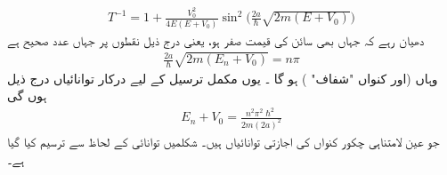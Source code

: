 \begin{align}\label{مساوات_شروڈنگر_ترسیلی_حل}
T^{-1}=1+\frac{V_{0}^{2}}{4E(E+V_{0})}\sin^{2}\big(\frac{2a}{\hslash}\sqrt{2m(E+V_{0})} \big) 
 \end{align}
 دھیان رہے کہ  جہاں بھی سائن کی قیمت صفر ہو، یعنی درج ذیل نقطوں پر جہاں  عدد صحیح ہے 
 \begin{align}
 \frac{2a}{\hslash}\sqrt{2m(E_{n}+V_{0})}=n\pi 
 \end{align}
  وہاں   (اور کنواں "شفاف" )   ہو گا  ۔ یوں مکمل ترسیل کے لیے درکار توانائیاں  درج ذیل ہوں گی
\begin{align}
E_{n}+V_{0}=\frac{n^{2}\pi^{2}\hslash^{2}}{2m(2a)^{2}} 
\end{align}
 جو عین لامتناہی چکور  کنواں کی اجازتی توانائیاں ہیں۔  شکلمیں توانائی  کے لحاظ سے   ترسیم کیا گیا ہے۔



